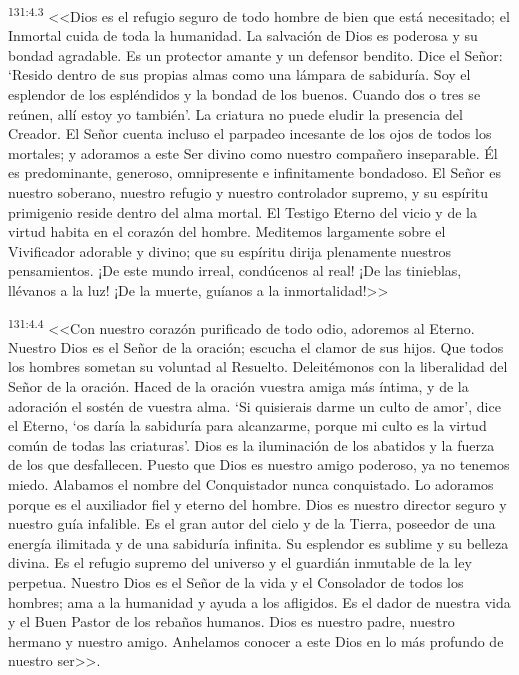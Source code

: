 \par 
\textsuperscript{131:4.3} <<Dios es el refugio seguro de todo hombre de bien que está necesitado; el Inmortal cuida de toda la humanidad. La salvación de Dios es poderosa y su bondad agradable. Es un protector amante y un defensor bendito. Dice el Señor: `Resido dentro de sus propias almas como una lámpara de sabiduría. Soy el esplendor de los espléndidos y la bondad de los buenos. Cuando dos o tres se reúnen, allí estoy yo también'. La criatura no puede eludir la presencia del Creador. El Señor cuenta incluso el parpadeo incesante de los ojos de todos los mortales; y adoramos a este Ser divino como nuestro compañero inseparable. Él es predominante, generoso, omnipresente e infinitamente bondadoso. El Señor es nuestro soberano, nuestro refugio y nuestro controlador supremo, y su espíritu primigenio reside dentro del alma mortal. El Testigo Eterno del vicio y de la virtud habita en el corazón del hombre. Meditemos largamente sobre el Vivificador adorable y divino; que su espíritu dirija plenamente nuestros pensamientos. ¡De este mundo irreal, condúcenos al real! ¡De las tinieblas, llévanos a la luz! ¡De la muerte, guíanos a la inmortalidad!>>

\par 
\textsuperscript{131:4.4} <<Con nuestro corazón purificado de todo odio, adoremos al Eterno. Nuestro Dios es el Señor de la oración; escucha el clamor de sus hijos. Que todos los hombres sometan su voluntad al Resuelto. Deleitémonos con la liberalidad del Señor de la oración. Haced de la oración vuestra amiga más íntima, y de la adoración el sostén de vuestra alma. `Si quisierais darme un culto de amor', dice el Eterno, `os daría la sabiduría para alcanzarme, porque mi culto es la virtud común de todas las criaturas'. Dios es la iluminación de los abatidos y la fuerza de los que desfallecen. Puesto que Dios es nuestro amigo poderoso, ya no tenemos miedo. Alabamos el nombre del Conquistador nunca conquistado. Lo adoramos porque es el auxiliador fiel y eterno del hombre. Dios es nuestro director seguro y nuestro guía infalible. Es el gran autor del cielo y de la Tierra, poseedor de una energía ilimitada y de una sabiduría infinita. Su esplendor es sublime y su belleza divina. Es el refugio supremo del universo y el guardián inmutable de la ley perpetua. Nuestro Dios es el Señor de la vida y el Consolador de todos los hombres; ama a la humanidad y ayuda a los afligidos. Es el dador de nuestra vida y el Buen Pastor de los rebaños humanos. Dios es nuestro padre, nuestro hermano y nuestro amigo. Anhelamos conocer a este Dios en lo más profundo de nuestro ser>>.

